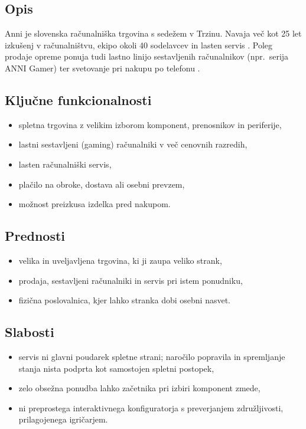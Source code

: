 \documentclass[11pt,a4paper]{article}
\begin{document}
\subsection*{Opis}
Anni je slovenska računalniška trgovina s sedežem v Trzinu. Navaja več kot 25
let izkušenj v računalništvu, ekipo okoli 40 sodelavcev in lasten servis
\cite{ceneje-anni}. Poleg prodaje opreme ponuja tudi lastno linijo
sestavljenih računalnikov (npr.\ serija ANNI Gamer) \cite{ceneje-anni-znamka}
ter svetovanje pri nakupu po telefonu \cite{zurnal-anni}.

\subsection*{Ključne funkcionalnosti}
\begin{itemize}
  \item spletna trgovina z velikim izborom komponent, prenosnikov in periferije,
  \item lastni sestavljeni (gaming) računalniki v več cenovnih razredih,
  \item lasten računalniški servis,
  \item plačilo na obroke, dostava ali osebni prevzem,
  \item možnost preizkusa izdelka pred nakupom.
\end{itemize}

\subsection*{Prednosti}
\begin{itemize}
  \item velika in uveljavljena trgovina, ki ji zaupa veliko strank,
  \item prodaja, sestavljeni računalniki in servis pri istem ponudniku,
  \item fizična poslovalnica, kjer lahko stranka dobi osebni nasvet.
\end{itemize}

\subsection*{Slabosti}
\begin{itemize}
  \item servis ni glavni poudarek spletne strani; naročilo popravila in
        spremljanje stanja nista podprta kot samostojen spletni postopek,
  \item zelo obsežna ponudba lahko začetnika pri izbiri komponent zmede,
  \item ni preprostega interaktivnega konfiguratorja s preverjanjem
        združljivosti, prilagojenega igričarjem.
\end{itemize}
\end{document}
